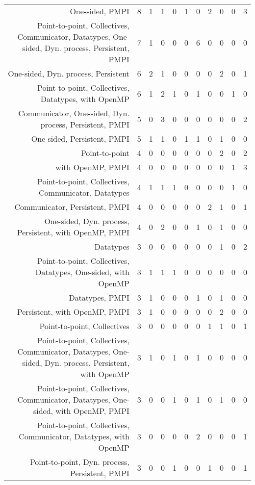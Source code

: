 {\begin{landscape}
\begin{longtable}[htb]{r|c|c|c|c|c|c|c|c|c|c}
{One-sided, PMPI} & 8 & 1 & 1 & 0 & 1 & 0 & 2 & 0 & 0 & 3 \\%
{Point-to-point, Collectives, Communicator, Datatypes, One-sided, Dyn. process, Persistent, PMPI} & 7 & 1 & 0 & 0 & 0 & 6 & 0 & 0 & 0 & 0 \\%
{One-sided, Dyn. process, Persistent} & 6 & 2 & 1 & 0 & 0 & 0 & 0 & 2 & 0 & 1 \\%
{Point-to-point, Collectives, Datatypes, with OpenMP} & 6 & 1 & 2 & 1 & 0 & 1 & 0 & 0 & 1 & 0 \\%
{Communicator, One-sided, Dyn. process, Persistent, PMPI} & 5 & 0 & 3 & 0 & 0 & 0 & 0 & 0 & 0 & 2 \\%
{One-sided, Persistent, PMPI} & 5 & 1 & 1 & 0 & 1 & 1 & 0 & 1 & 0 & 0 \\%
{Point-to-point} & 4 & 0 & 0 & 0 & 0 & 0 & 0 & 2 & 0 & 2 \\%
{with OpenMP, PMPI} & 4 & 0 & 0 & 0 & 0 & 0 & 0 & 0 & 1 & 3 \\%
{Point-to-point, Collectives, Communicator, Datatypes} & 4 & 1 & 1 & 1 & 0 & 0 & 0 & 0 & 1 & 0 \\%
{Communicator, Persistent, PMPI} & 4 & 0 & 0 & 0 & 0 & 0 & 2 & 1 & 0 & 1 \\%
{One-sided, Dyn. process, Persistent, with OpenMP, PMPI} & 4 & 0 & 2 & 0 & 0 & 1 & 0 & 1 & 0 & 0 \\%
{Datatypes} & 3 & 0 & 0 & 0 & 0 & 0 & 0 & 1 & 0 & 2 \\%
{Point-to-point, Collectives, Datatypes, One-sided, with OpenMP} & 3 & 1 & 1 & 1 & 0 & 0 & 0 & 0 & 0 & 0 \\%
{Datatypes, PMPI} & 3 & 1 & 0 & 0 & 0 & 1 & 0 & 1 & 0 & 0 \\%
{Persistent, with OpenMP, PMPI} & 3 & 1 & 0 & 0 & 0 & 0 & 0 & 2 & 0 & 0 \\%
{Point-to-point, Collectives} & 3 & 0 & 0 & 0 & 0 & 0 & 1 & 1 & 0 & 1 \\%
{Point-to-point, Collectives, Communicator, Datatypes, One-sided, Dyn. process, Persistent, with OpenMP} & 3 & 1 & 0 & 1 & 0 & 1 & 0 & 0 & 0 & 0 \\%
{Point-to-point, Collectives, Communicator, Datatypes, One-sided, with OpenMP, PMPI} & 3 & 0 & 0 & 1 & 0 & 1 & 0 & 1 & 0 & 0 \\%
{Point-to-point, Collectives, Communicator, Datatypes, with OpenMP} & 3 & 0 & 0 & 0 & 0 & 2 & 0 & 0 & 0 & 1 \\%
{Point-to-point, Dyn. process, Persistent, PMPI} & 3 & 0 & 0 & 1 & 0 & 0 & 1 & 0 & 0 & 1 \\%

\end{longtable}
\end{landscape}}
